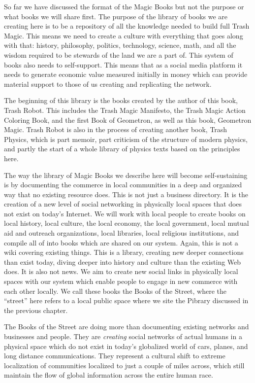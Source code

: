 So far we have discussed the format of the Magic Books but not the
purpose or what books we will share first. The purpose of the library of
books we are creating here is to be a repository of all the knowledge
needed to build full Trash Magic. This means we need to create a culture
with everything that goes along with that: history, philosophy,
politics, technology, science, math, and all the wisdom required to be
stewards of the land we are a part of. This system of books also needs
to self-support. This means that as a social media platform it needs to
generate economic value measured initially in money which can provide
material support to those of us creating and replicating the network.

The beginning of this library is the books created by the author of this
book, Trash Robot. This includes the Trash Magic Manifesto, the Trash
Magic Action Coloring Book, and the first Book of Geometron, as well as
this book, Geometron Magic. Trash Robot is also in the process of
creating another book, Trash Physics, which is part memoir, part
criticism of the structure of modern physics, and partly the start of a
whole library of physics texts based on the principles here.

The way the library of Magic Books we describe here will become
self-sustaining is by documenting the commerce in local communities in a
deep and organized way that no existing resource does. This is not just
a business directory. It is the creation of a new level of social
networking in physically local spaces that does not exist on today's
Internet. We will work with local people to create books on local
history, local culture, the local economy, the local government, local
mutual aid and outreach organizations, local libraries, local religious
institutions, and compile all of into books which are shared on our
system. Again, this is not a wiki covering existing things. This is a
library, creating new deeper connections than exist today, diving deeper
into history and culture than the existing Web does. It is also not
news. We aim to create new social links in physically local spaces with
our system which enable people to engage in new commerce with each other
locally. We call these books the Books of the Street, where the
``street'' here refers to a local public space where we site the Pibrary
discussed in the previous chapter.

The Books of the Street are doing more than documenting existing
networks and businesses and people. They are \emph{creating} social
networks of actual humans in a physical space which do not exist in
today's globalized world of cars, planes, and long distance
communications. They represent a cultural shift to extreme localization
of communities localized to just a couple of miles across, which still
maintain the flow of global information across the entire human race.


